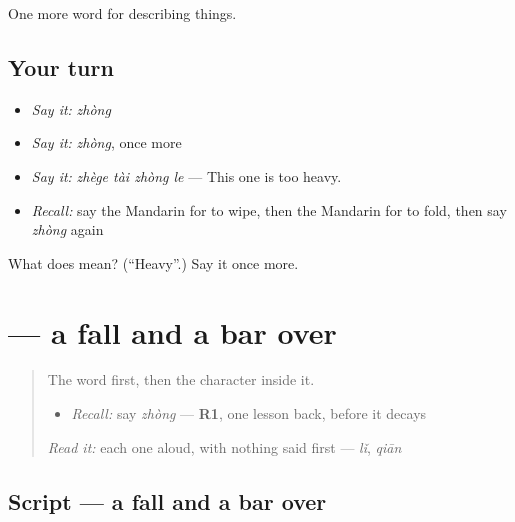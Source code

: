 \begin{grammarlens}[title={What you've built}]
One more word for describing things.
\end{grammarlens}

\subsection*{Your turn}
\begin{itemize}
\raggedright
  \item \emph{Say it:} \emph{zhòng}
  \item \emph{Say it:} \emph{zhòng}, once more
  \item \emph{Say it:} \emph{zhège tài zhòng le} — This one is too heavy.
  \item \emph{Recall:} say the Mandarin for to wipe, then the Mandarin for to fold, then say \emph{zhòng} again
\end{itemize}

\begin{tcolorbox}[breakable,colback=teal!4,colframe=teal!35!black,title={Before you move on}]
What does  mean? (\textquotedblleft{}Heavy\textquotedblright{}.) Say it once more.
\end{tcolorbox}
\section[\texorpdfstring{\zh{重} (zhòng)}{重 (zhòng)}]{ — a fall and a bar over }

\label{lesson:ZH-W134-zhong-heavy}



\begin{quote}
The word first, then the character inside it.

\begin{itemize}
\raggedright
  \item \emph{Recall:} say \emph{zhòng} — \textbf{R1}, one lesson back, before it decays
\end{itemize}

\begin{quote}
 
\end{quote}

\emph{Read it:} each one aloud, with nothing said first — \emph{lǐ}, \emph{qiān}
\end{quote}

\subsection*{Script — a fall and a bar over }

